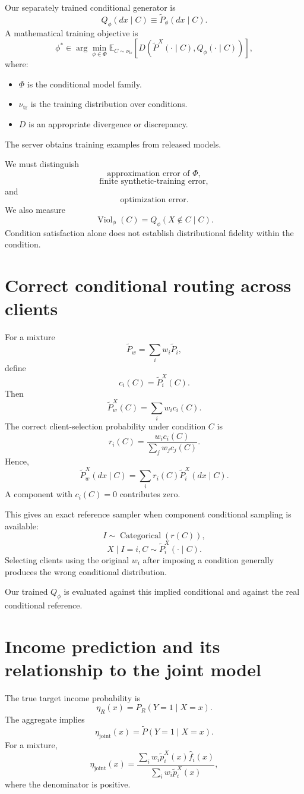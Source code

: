 \documentclass[11pt,a4paper]{article}
\begin{document}
Our separately trained conditional generator is
\[
\boxed{Q_\phi(dx\mid C)\equiv\widetilde P_\phi(dx\mid C).}
\]
A mathematical training objective is
\[
\boxed{\phi^*\in\arg\min_{\phi\in\Phi}
\mathbb E_{C\sim\nu_{\mathrm{tr}}}
\left[D\left(\widetilde P^X(\cdot\mid C),Q_\phi(\cdot\mid C)\right)\right],}
\]
where:
\begin{itemize}
\item $\Phi$ is the conditional model family.
\item $\nu_{\mathrm{tr}}$ is the training distribution over conditions.
\item $D$ is an appropriate divergence or discrepancy.
\end{itemize}
The server obtains training examples from released models.

We must distinguish
\[
\text{approximation error of }\Phi,
\]
\[
\text{finite synthetic-training error},
\]
and
\[
\text{optimization error}.
\]
We also measure
\[
\operatorname{Viol}_\phi(C)=Q_\phi(X\notin C\mid C).
\]
Condition satisfaction alone does not establish distributional fidelity within the condition.

\section{Correct conditional routing across clients}
For a mixture
\[
\widetilde P_w=\sum_iw_i\widetilde P_i,
\]
define
\[
c_i(C)=\widetilde P_i^X(C).
\]
Then
\[
\widetilde P_w^X(C)=\sum_iw_i c_i(C).
\]
The correct client-selection probability under condition $C$ is
\[
\boxed{r_i(C)=\frac{w_i c_i(C)}{\sum_jw_j c_j(C)}.}
\]
Hence,
\[
\boxed{\widetilde P_w^X(dx\mid C)=\sum_i r_i(C)\widetilde P_i^X(dx\mid C).}
\]
A component with $c_i(C)=0$ contributes zero.

This gives an exact reference sampler when component conditional sampling is available:
\[
I\sim\operatorname{Categorical}(r(C)),
\]
\[
X\mid I=i,C\sim\widetilde P_i^X(\cdot\mid C).
\]
Selecting clients using the original $w_i$ after imposing a condition generally produces the wrong conditional distribution.

Our trained $Q_\phi$ is evaluated against this implied conditional and against the real conditional reference.

\section{Income prediction and its relationship to the joint model}
The true target income probability is
\[
\eta_R(x)=P_R(Y=1\mid X=x).
\]
The aggregate implies
\[
\boxed{\eta_{\mathrm{joint}}(x)=\widetilde P(Y=1\mid X=x).}
\]
For a mixture,
\[
\boxed{\eta_{\mathrm{joint}}(x)=
\frac{\sum_iw_i\widetilde p_i^X(x)\widehat f_i(x)}
{\sum_iw_i\widetilde p_i^X(x)},}
\]
where the denominator is positive.
\end{document}
